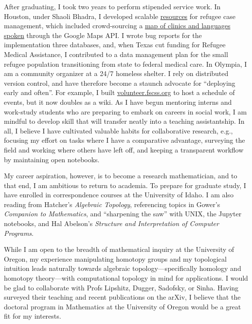 \documentclass{article}
\begin{document}
After graduating, I took two years to perform stipended service work. In Houston, under Shaoli Bhadra, I developed scalable \href{https://github.com/coltongrainger/ymca-resources}{resources} for refugee case management, which included crowd-sourcing a \href{https://drive.google.com/open?id=1kk9yn6-4nifHLIf2tGYbW_7PiYo\&usp=sharing}{map of clinics and languages spoken} through the Google Maps API. I wrote bug reports for the implementation three databases, and, when Texas cut funding for Refugee Medical Assistance, I contributed to a data management plan for the small refugee population transitioning from state to federal medical care. In Olympia, I am a community organizer at a 24/7 homeless shelter. I rely on distributed version control, and have therefore become a staunch advocate for ``deploying early and often''. For example, I built \mbox{\href{http://volunteer.fscss.org}{volunteer.fscss.org}} to host a schedule of events, but it now doubles as a wiki. As I have begun mentoring interns and work-study students who are preparing to embark on careers in social work, I am mindful to develop skill that will transfer neatly into a teaching assistantship. In all, I believe I have cultivated valuable habits for collaborative research, e.g., focusing my effort on tasks where I have a comparative advantage, surveying the field and working where others have left off, and keeping a transparent workflow by maintaining open notebooks.

My career aspiration, however, is to become a research mathematician, and to that end, I am ambitious to return to academia. To prepare for graduate study, I have enrolled in correspondence courses at the University of Idaho. I am also reading from Hatcher's \emph{Algebraic Topology}, referencing topics in Gower's \emph{Companion to Mathematics}, and ``sharpening the saw'' with UNIX, the Jupyter notebooks, and Hal Abelson's \emph{Structure and Interpretation of Computer Programs}.

While I am open to the breadth of mathematical inquiry at the University of Oregon, my experience manipulating homotopy groups and my topological intuition leads naturally towards algebraic topology---specifically homology and homotopy theory---with computational topology in mind for applications. I would be glad to collaborate with Profs Lipshitz, Dugger, Sadofsky, or Sinha. Having surveyed their teaching and recent publications on the arXiv, I believe that the doctoral program in Mathematics at the University of Oregon would be a great fit for my interests.

\printbibliography
\end{document}
